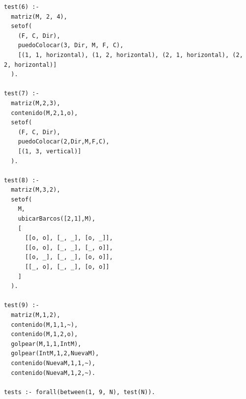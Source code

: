 \documentclass[a4paper]{article}
\begin{document}
\begin{verbatim}
test(6) :-
  matriz(M, 2, 4),
  setof(
    (F, C, Dir),
    puedoColocar(3, Dir, M, F, C),
    [(1, 1, horizontal), (1, 2, horizontal), (2, 1, horizontal), (2, 2, horizontal)]
  ).
  
test(7) :-
  matriz(M,2,3),
  contenido(M,2,1,o),
  setof(
    (F, C, Dir),
    puedoColocar(2,Dir,M,F,C),
    [(1, 3, vertical)]
  ).
  
test(8) :-
  matriz(M,3,2),
  setof(
    M,
    ubicarBarcos([2,1],M),
    [
      [[o, o], [_, _], [o, _]],
      [[o, o], [_, _], [_, o]],
      [[o, _], [_, _], [o, o]],
      [[_, o], [_, _], [o, o]]
    ]
  ).
  
test(9) :-
  matriz(M,1,2),
  contenido(M,1,1,~),
  contenido(M,1,2,o),
  golpear(M,1,1,IntM),
  golpear(IntM,1,2,NuevaM),
  contenido(NuevaM,1,1,~),
  contenido(NuevaM,1,2,~).

tests :- forall(between(1, 9, N), test(N)).

\end{verbatim}
\end{document}
